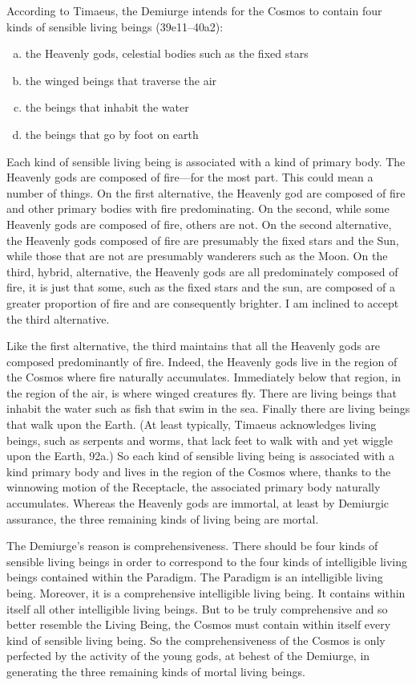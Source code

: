According to Timaeus, the Demiurge intends for the Cosmos to contain four kinds of sensible living beings (39e11--40a2):
\begin{enumerate}[(a)]
	\item the Heavenly gods, celestial bodies such as the fixed stars
	\item the winged beings that traverse the air
	\item the beings that inhabit the water
	\item the beings that go by foot on earth
\end{enumerate}
Each kind of sensible living being is associated with a kind of primary body. The Heavenly gods are composed of fire---for the most part. This could mean a number of things. On the first alternative, the Heavenly god are composed of fire and other primary bodies with fire predominating. On the second, while some Heavenly gods are composed of fire, others are not. On the second alternative, the Heavenly gods composed of fire are presumably the fixed stars and the Sun, while those that are not are presumably wanderers such as the Moon. On the third, hybrid, alternative, the Heavenly gods are all predominately composed of fire, it is just that some, such as the fixed stars and the sun, are composed of a greater proportion of fire and are consequently brighter. I am inclined to accept the third alternative. 

Like the first alternative, the third maintains that all the Heavenly gods are composed predominantly of fire. Indeed, the Heavenly gods live in the region of the Cosmos where fire naturally accumulates. Immediately below that region, in the region of the air, is where winged creatures fly. There are living beings that inhabit the water such as fish that swim in the sea. Finally there are living beings that walk upon the Earth. (At least typically, Timaeus acknowledges living beings, such as serpents and worms, that lack feet to walk with and yet wiggle upon the Earth, 92a.) So each kind of sensible living being is associated with a kind primary body and lives in the region of the Cosmos where, thanks to the winnowing motion of the Receptacle, the associated primary body naturally accumulates. Whereas the Heavenly gods are immortal, at least by Demiurgic assurance, the three remaining kinds of living being are mortal.

The Demiurge's reason is comprehensiveness. There should be four kinds of sensible living beings in order to correspond to the four kinds of intelligible living beings contained within the Paradigm. The Paradigm is an intelligible living being. Moreover, it is a comprehensive intelligible living being. It contains within itself all other intelligible living beings. But to be truly comprehensive and so better resemble the Living Being, the Cosmos must contain within itself every kind of sensible living being. So the comprehensiveness of the Cosmos is only perfected by the activity of the young gods, at behest of the Demiurge, in generating the three remaining kinds of mortal living beings.

